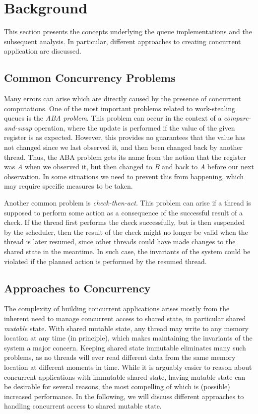 \section{Background}
\label{sec:background}

This section presents the concepts underlying the queue implementations and the subsequent analysis. In particular, different approaches to creating concurrent application are discussed.

\subsection{Common Concurrency Problems}
Many errors can arise which are directly caused by the presence of concurrent computations. One of the most important problems related to work-stealing queues is the \emph{ABA problem}. This problem can occur in the context of a \emph{compare-and-swap} operation, where the update is performed if the value of the given register is as expected. However, this provides no guarantees that the value has not changed since we last observed it, and then been changed back by another thread. Thus, the ABA problem gets its name from the notion that the register was \emph{A} when we observed it, but then changed to \emph{B} and back to \emph{A} before our next observation. In some situations we need to prevent this from happening, which may require specific measures to be taken.

Another common problem is \emph{check-then-act}. This problem can arise if a thread is supposed to perform some action as a consequence of the successful result of a check. If the thread first performs the check successfully, but is then suspended by the scheduler, then the result of the check might no longer be valid when the thread is later resumed, since other threads could have made changes to the shared state in the meantime. In such case, the invariants of the system could be violated if the planned action is performed by the resumed thread.

\subsection{Approaches to Concurrency}
The complexity of building concurrent applications arises mostly from the inherent need to manage concurrent access to shared state, in particular shared \emph{mutable} state. With shared mutable state, any thread may write to any memory location at any time (in principle), which makes maintaining the invariants of the system a major concern. Keeping shared state immutable eliminates many such problems, as no threads will ever read different data from the same memory location at different moments in time. While it is arguably easier to reason about concurrent applications with immutable shared state, having mutable state can be desirable for several reasons, the most compelling of which is (possible) increased performance. In the following, we will discuss different approaches to handling concurrent access to shared mutable state.

